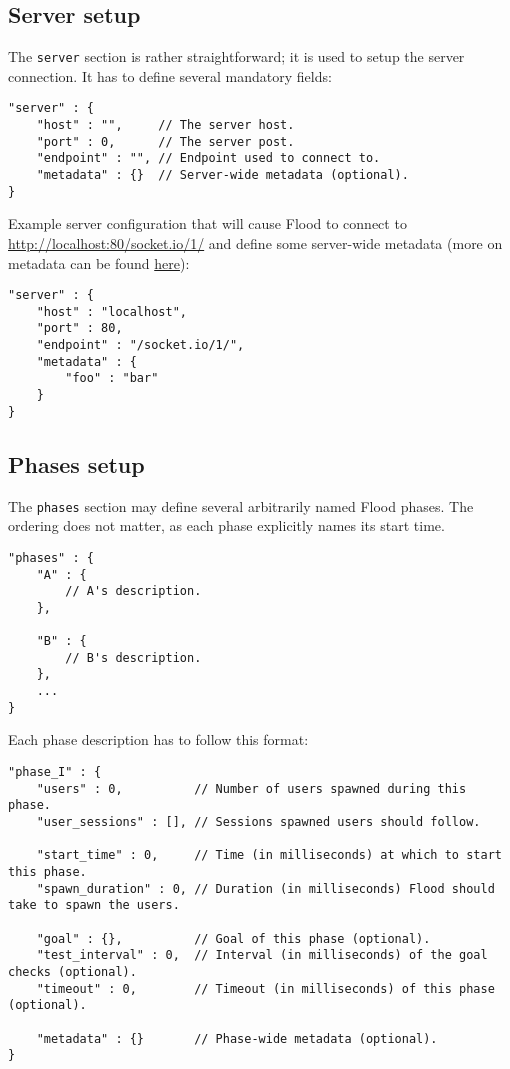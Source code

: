 \documentclass[a4paper]{article}
\begin{document}
\subsection{Server setup}
\label{sec-3-2}

The \texttt{server} section is rather straightforward; it is used to setup the server connection. It has to define several mandatory fields:


\begin{verbatim}
"server" : {
    "host" : "",     // The server host.
    "port" : 0,      // The server post.
    "endpoint" : "", // Endpoint used to connect to.
    "metadata" : {}  // Server-wide metadata (optional).
}
\end{verbatim}




\noindent
Example server configuration that will cause Flood to connect to \href{http://localhost:80/socket.io/1/}{http://localhost:80/socket.io/1/} and define some server-wide metadata (more on metadata can be found \hyperref[sec-3-6]{here}):


\begin{verbatim}
"server" : {
    "host" : "localhost",
    "port" : 80,
    "endpoint" : "/socket.io/1/",
    "metadata" : {
        "foo" : "bar"
    }
}
\end{verbatim}
\subsection{Phases setup}
\label{sec-3-3}
\label{ref-phase_setup}


The \texttt{phases} section may define several arbitrarily named Flood phases. The ordering does not matter, as each phase explicitly names its start time.


\begin{verbatim}
"phases" : {
    "A" : {
        // A's description.
    },

    "B" : {
        // B's description.
    },
    ...
}
\end{verbatim}




\noindent
Each phase description has to follow this format:


\begin{verbatim}
"phase_I" : {
    "users" : 0,          // Number of users spawned during this phase.
    "user_sessions" : [], // Sessions spawned users should follow.

    "start_time" : 0,     // Time (in milliseconds) at which to start this phase.
    "spawn_duration" : 0, // Duration (in milliseconds) Flood should take to spawn the users.

    "goal" : {},          // Goal of this phase (optional).
    "test_interval" : 0,  // Interval (in milliseconds) of the goal checks (optional).
    "timeout" : 0,        // Timeout (in milliseconds) of this phase (optional).

    "metadata" : {}       // Phase-wide metadata (optional).
}
\end{verbatim}
\end{document}
